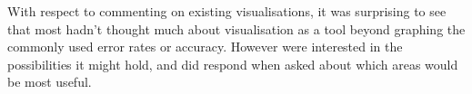 \documentclass[a4paper,11pt,titlepage]{article}
\begin{document}
	\begin{figure}[H]
	\end{figure}
	
	With respect to commenting on existing visualisations, it was surprising to see that most hadn't thought much about visualisation as a tool beyond graphing the commonly used error rates or accuracy. However were interested in the possibilities it might hold, and did respond when asked about which areas would be most useful.
\end{document}
